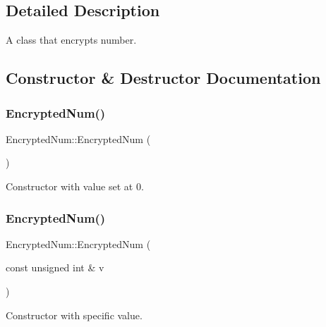 \subsection{Detailed Description}
A class that encrypts number. 

\subsection{Constructor \& Destructor Documentation}
\mbox{\label{class_encrypted_num_ab53b1c8adf7c2b2770f00e88fe98f270}} 
\subsubsection{\texorpdfstring{Encrypted\+Num()}{EncryptedNum()}\hspace{0.1cm}{\footnotesize\ttfamily [1/2]}}
{\footnotesize\ttfamily Encrypted\+Num\+::\+Encrypted\+Num (\begin{DoxyParamCaption}{ }\end{DoxyParamCaption})}



Constructor with value set at 0. 

\mbox{\label{class_encrypted_num_aeb560ce38d13963932a5247917d2bb7b}} 
\subsubsection{\texorpdfstring{Encrypted\+Num()}{EncryptedNum()}\hspace{0.1cm}{\footnotesize\ttfamily [2/2]}}
{\footnotesize\ttfamily Encrypted\+Num\+::\+Encrypted\+Num (\begin{DoxyParamCaption}\item[{const unsigned int \&}]{v }\end{DoxyParamCaption})}



Constructor with specific value. 

\mbox{\label{class_encrypted_num_a795b635aeef60427532e1a8f26db8cdd}} 
